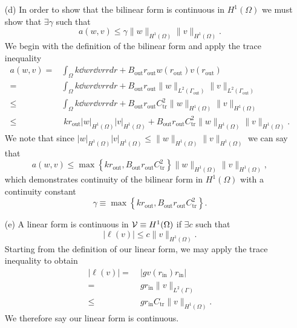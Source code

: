 \documentclass{article}
\begin{document}
\begin{itemize}
	\item[(d)] In order to show that the bilinear form is continuous in \(H^1(\Omega) \) we must show that \(\exists\gamma \) such that 
	\begin{equation}
		a(w,v) \leq \gamma \|w\|_{H^1(\Omega)}\|v\|_{H^1(\Omega)}.
	\end{equation}
	We begin with the definition of the bilinear form and apply the trace inequality
	\begin{align}
		a(w,v) =& \int_\Omega k \dd{w}{r}\dd{v}{r}rdr + B_\text{out}r_\text{out}w(r_\text{out})v(r_\text{out})\\
			=& \int_\Omega k \dd{w}{r}\dd{v}{r}rdr + B_\text{out}r_\text{out} \|w\|_{L^2(\Gamma_\text{out})} \|v\|_{L^2(\Gamma_\text{out})}\\
			\leq& \int_\Omega k \dd{w}{r}\dd{v}{r}rdr + B_\text{out}r_\text{out}C_\text{tr}^2 \|w\|_{H^1(\Omega)} \|v\|_{H^1(\Omega)} \\
			\leq& \;kr_\text{out}  |w|_{H^1(\Omega)}|v|_{H^1(\Omega)} + B_\text{out}r_\text{out}C_\text{tr}^2 \|w\|_{H^1(\Omega)} \|v\|_{H^1(\Omega)}.
	\end{align}
	We note that since \(|w|_{H^1(\Omega)}|v|_{H^1(\Omega)} \leq \|w\|_{H^1(\Omega)}\|v\|_{H^1(\Omega)}\) we can say that 
	\begin{equation}
		a(w,v) \leq \max\left\{kr_\text{out}, B_\text{out}r_\text{out}C_\text{tr}^2 \right\}\|w\|_{H^1(\Omega)}\|v\|_{H^1(\Omega)},
	\end{equation}
	which demonstrates continuity of the bilinear form in \(H^1(\Omega)\) with a continuity constant
	\begin{equation}
		\gamma \equiv \max\left\{kr_\text{out}, B_\text{out}r_\text{out}C_\text{tr}^2 \right\}.
	\end{equation}
	
	\item[(e)] A linear form is continuous in \(\mathcal{V} \equiv H^1(\Omega) \) if \(\exists c \) such that
	\begin{equation}
		|\ell(v)| \leq c\|v\|_{H^1(\Omega)}.
	\end{equation}
	Starting from the definition of our linear form, we may apply the trace inequality to obtain
	\begin{align}
		|\ell(v)| =&\; |gv(r_\text{in})r_\text{in}| \\
			=&\; gr_\text{in} \|v\|_{L^2(\Gamma)} \\
			\leq&\; g r_\text{in} C_\text{tr} \|v\|_{H^1(\Omega)}.
	\end{align}
	We therefore say our linear form is continuous. 
	

\end{itemize}
\end{document}

